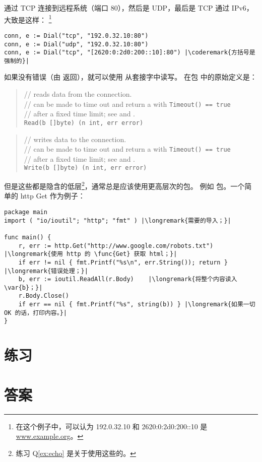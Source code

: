 通过 TCP 连接到远程系统（端口 80），然后是 UDP，最后是 TCP 通过 IPv6，大致是这样：
\footnote{在这个例子中，可以认为 192.0.32.10 和 2620:0:2d0:200::10 是 \url{www.example.org}。}
\begin{lstlisting}
conn, e := Dial("tcp", "192.0.32.10:80")
conn, e := Dial("udp", "192.0.32.10:80")
conn, e := Dial("tcp", "[2620:0:2d0:200::10]:80") |\coderemark{方括号是强制的}|
\end{lstlisting}

如果没有错误（由  返回），就可以使用  从套接字中读写。
在包  中的原始定义是：
\begin{quote}
//  reads data from the connection.\\
//  can be made to time out and return a  with \lstinline{Timeout() == true}\\
// after a fixed time limit; see  and .\\
\lstinline{Read(b []byte) (n int, err error)}
\end{quote}

\begin{quote}
//  writes data to the connection.\\
//  can be made to time out and return a  with \lstinline{Timeout() == true}\\
// after a fixed time limit; see  and .\\
\lstinline{Write(b []byte) (n int, err error)}
\end{quote}

但是这些都是隐含的低层\footnote{练习 Q\ref{ex:echo} 是关于使用这些的。}，通常总是应该使用更高层次的包。
例如  包。一个简单的 http Get 作为例子：
\begin{lstlisting}
package main
import ( "io/ioutil"; "http"; "fmt" ) |\longremark{需要的导入；}|

func main() {
    r, err := http.Get("http://www.google.com/robots.txt") |\longremark{使用 http 的 \func{Get} 获取 html；}|
    if err != nil { fmt.Printf("%s\n", err.String()); return } |\longremark{错误处理；}|
    b, err := ioutil.ReadAll(r.Body)    |\longremark{将整个内容读入 \var{b}；}|
    r.Body.Close()  
    if err == nil { fmt.Printf("%s", string(b)) } |\longremark{如果一切 OK 的话，打印内容。}|
}
\end{lstlisting}
\showremarks

\section{练习}














\cleardoublepage
\section{答案}
\shipoutAnswer
